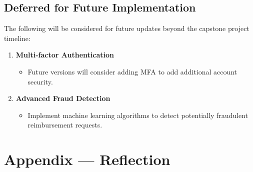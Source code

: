\documentclass{article}
\begin{document}
\subsection{Deferred for Future Implementation}

The following will be considered for future updates beyond the capstone project timeline:

\begin{enumerate}
    \item \textbf{Multi-factor Authentication}
    \begin{itemize}
        \item Future versions will consider adding MFA to add additional account security.
    \end{itemize}

    \item \textbf{Advanced Fraud Detection}
    \begin{itemize}
        \item Implement machine learning algorithms to detect potentially fraudulent reimbursement requests.
    \end{itemize}
\end{enumerate}

\newpage{}

\section*{Appendix --- Reflection}



\end{document}
